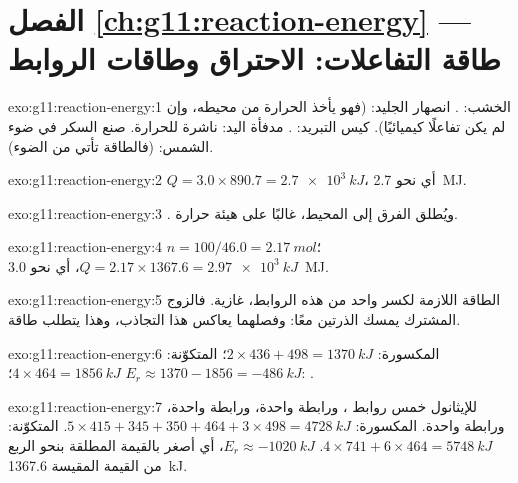\section*{الفصل \ref{ch:g11:reaction-energy} --- طاقة التفاعلات: الاحتراق وطاقات الروابط}

\begin{solution}{exo:g11:reaction-energy:1}
 الخشب: . انصهار الجليد:  (فهو يأخذ الحرارة من
محيطه، وإن لم يكن تفاعلًا كيميائيًا). كيس التبريد:
. مدفأة اليد: ناشرة للحرارة. صنع السكر في ضوء الشمس:
 (فالطاقة تأتي من الضوء).
\end{solution}

\begin{solution}{exo:g11:reaction-energy:2}
$Q = 3.0 \times 890.7 = \qty{2.7e3}{kJ}$، أي نحو \qty{2.7}{MJ}.
\end{solution}

\begin{solution}{exo:g11:reaction-energy:3}
. ويُطلق الفرق إلى المحيط، غالبًا على هيئة
حرارة.
\end{solution}

\begin{solution}{exo:g11:reaction-energy:4}
$n = 100 / 46.0 = \qty{2.17}{mol}$؛ $Q = 2.17 \times 1367.6 =
\qty{2.97e3}{kJ}$، أي نحو \qty{3.0}{MJ}.
\end{solution}

\begin{solution}{exo:g11:reaction-energy:5}
الطاقة اللازمة لكسر  واحد من هذه الروابط،  
غازية. فالزوج المشترك يمسك الذرتين معًا: وفصلهما
يعاكس هذا التجاذب، وهذا يتطلب طاقة.
\end{solution}

\begin{solution}{exo:g11:reaction-energy:6}
المكسورة: $2 \times 436 + 498 = \qty{1370}{kJ}$؛ المتكوّنة:
$4 \times 464 = \qty{1856}{kJ}$؛ $E_r \approx 1370 - 1856 =
\qty{-486}{kJ}$: .
\end{solution}

\begin{solution}{exo:g11:reaction-energy:7}
للإيثانول  خمس روابط ، ورابطة  واحدة، ورابطة  واحدة، ورابطة
 واحدة. المكسورة: $5 \times 415 + 345 + 350 + 464 + 3 \times 498 =
\qty{4728}{kJ}$. المتكوّنة: $4 \times 741 + 6 \times 464 = \qty{5748}{kJ}$.
$E_r \approx \qty{-1020}{kJ}$، أي أصغر بالقيمة المطلقة بنحو الربع من
القيمة المقيسة \qty{1367.6}{kJ}.
\end{solution}

